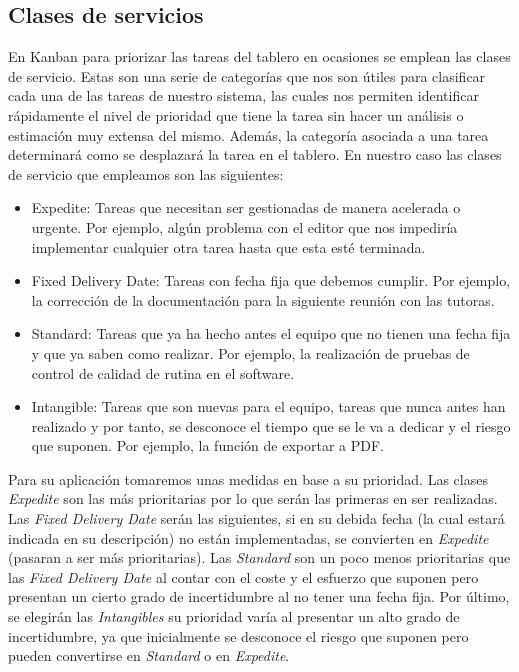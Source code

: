\subsection{Clases de servicios}
\label{claseDeServicio}
En Kanban para priorizar las tareas del tablero en ocasiones se emplean las clases de servicio. Estas son una serie de categorías que nos son útiles para clasificar cada una de las tareas de nuestro sistema, las cuales nos permiten identificar rápidamente el nivel de prioridad que tiene la tarea sin hacer un análisis o estimación muy extensa del mismo. Además, la categoría asociada a una tarea determinará como se desplazará la tarea en el tablero. En nuestro caso las clases de servicio que empleamos son las siguientes:
\begin{itemize}
  \item Expedite: Tareas que necesitan ser gestionadas de manera acelerada o urgente. Por ejemplo, algún problema con el editor que nos impediría implementar cualquier otra tarea hasta que esta esté terminada.
  \item Fixed Delivery Date: Tareas con fecha fija que debemos cumplir. Por ejemplo, la corrección de la documentación para la siguiente reunión con las tutoras.
  \item Standard: Tareas que ya ha hecho antes el equipo que no tienen una fecha fija y que ya saben como realizar. Por ejemplo, la realización de pruebas de control de calidad de rutina en el software.
  \item Intangible: Tareas que son nuevas para el equipo, tareas que nunca antes han realizado y por tanto, se desconoce el tiempo que se le va a dedicar y el riesgo que suponen. Por ejemplo, la función de exportar a PDF.
\end{itemize}

Para su aplicación tomaremos unas medidas en base a su prioridad. Las clases \textit{Expedite} son las más prioritarias por lo que serán las primeras en ser realizadas. Las \textit{Fixed Delivery Date} serán las siguientes, si en su debida fecha (la cual estará indicada en su descripción) no están implementadas, se convierten en \textit{Expedite} (pasaran a ser más prioritarias). Las \textit{Standard} son un poco menos prioritarias que las \textit{Fixed Delivery Date} al contar con el coste y el esfuerzo que suponen pero presentan un cierto grado de incertidumbre al no tener una fecha fija. Por último, se elegirán las \textit{Intangibles} su prioridad varía al presentar un alto grado de incertidumbre, ya que inicialmente se desconoce el riesgo que suponen pero pueden convertirse en \textit{Standard} o en \textit{Expedite}.

